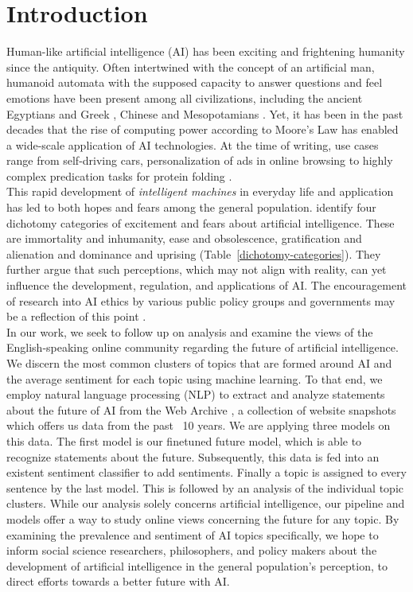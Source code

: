 \section{Introduction}

Human-like artificial intelligence (AI) has been exciting and frightening humanity since the antiquity.
Often intertwined with the concept of an artificial man, humanoid automata with the supposed capacity to answer questions and feel emotions have been present among all civilizations, including the ancient Egyptians and Greek \citep{Newquist1994}, Chinese \citep{cohen1986} and Mesopotamians \citep{unat2008}.
Yet, it has been in the past decades that the rise of computing power according to Moore’s Law has enabled a wide-scale application of AI technologies.
At the time of writing, use cases range from self-driving cars, personalization of ads in online browsing to highly complex predication tasks for protein folding \citep{jumper2021}.
\\
This rapid development of \emph{intelligent machines} in everyday life and application has led to both hopes and fears among the general population.
\citet{cave2019} identify four dichotomy categories of excitement and fears about artificial intelligence.
These are immortality and inhumanity, ease and obsolescence, gratification and alienation and dominance and uprising (Table~\ref{dichotomy-categories}).
They further argue that such perceptions, which may not align with reality, can yet influence the development, regulation, and applications of AI.
The encouragement of research into AI ethics by various public policy groups and governments may be a reflection of this point \citep{leslie2019}.
\\
In our work, we seek to follow up on \citet{cave2019} analysis and examine the views of the English-speaking online community regarding the future of artificial intelligence. We discern the most common clusters of topics that are formed around AI and the average sentiment for each topic using machine learning. To that end, we employ natural language processing (NLP) to extract and analyze statements about the future of AI from the Web Archive \citep{Deckers2022}, a collection of website snapshots which offers us data from the past ~10 years.
We are applying three models on this data.
The first model is our finetuned future model, which is able to recognize statements about the future.
Subsequently, this data is fed into an existent sentiment classifier  to add sentiments.
Finally a topic is assigned to every sentence by the last model.
This is followed by an analysis of the individual topic clusters.
While our analysis solely concerns artificial intelligence, our pipeline and models offer a way to study online views concerning the future for any topic. By examining the prevalence and sentiment of AI topics specifically, we hope to inform social science researchers, philosophers, and policy makers about the development of artificial intelligence in the general population’s perception, to direct efforts towards a better future with AI.

